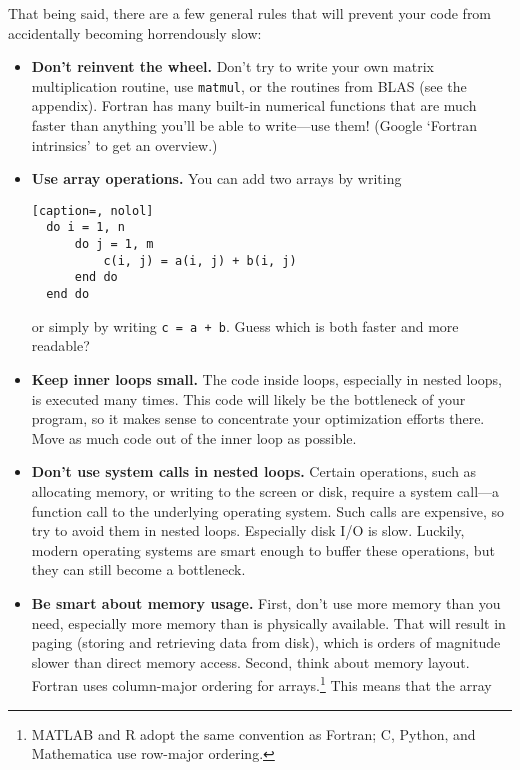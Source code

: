 That being said, there are a few general rules that will prevent your code from accidentally becoming horrendously slow:
\begin{itemize}
  \item\textbf{Don't reinvent the wheel.} Don't try to write your own matrix multiplication routine, use \texttt{matmul}, or the routines from BLAS (see the  appendix).
    Fortran has many built-in numerical functions that are much faster than anything you'll be able to write---use them! (Google `Fortran intrinsics' to get an overview.)
    \newpage
  \item\textbf{Use array operations.} You can add two arrays by writing
\begin{lstlisting}[caption=, nolol]
  do i = 1, n
      do j = 1, m
          c(i, j) = a(i, j) + b(i, j)
      end do
  end do
\end{lstlisting}
or simply by writing \texttt{c = a + b}.
Guess which is both faster and more readable?
  \item\textbf{Keep inner loops small.} The code inside loops, especially in nested loops, is executed many times.
    This code will likely be the bottleneck of your program, so it makes sense to concentrate your optimization efforts there.
    Move as much code out of the inner loop as possible.
  \item\textbf{Don't use system calls in nested loops.} Certain operations, such as allocating memory, or writing to the screen or disk, require a system call---a function call to the underlying operating system.
    Such calls are expensive, so try to avoid them in nested loops.
    Especially disk I/O is slow.
    Luckily, modern operating systems are smart enough to buffer these operations, but they can still become a bottleneck.
  \item\textbf{Be smart about memory usage.} First, don't use more memory than you need, especially more memory than is physically available.
    That will result in paging (storing and retrieving data from disk), which is orders of magnitude slower than direct memory access.
    Second, think about memory layout.
    Fortran uses column-major ordering for arrays.\footnote{MATLAB and R adopt the same convention as Fortran; C, Python, and Mathematica use row-major ordering.}
    This means that the array
    \begin{equation*}

\end{equation*}
\end{itemize}
